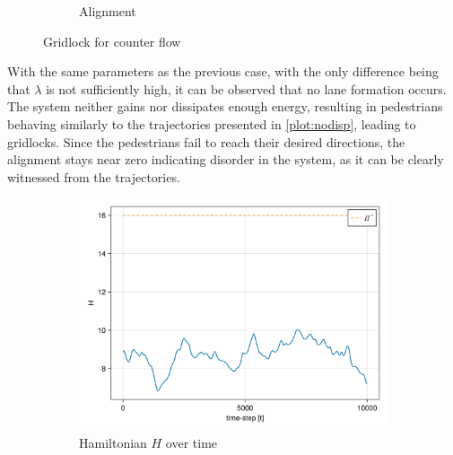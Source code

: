 \begin{itemize}
\begin{figure}[H]
\begin{subfigure}{.49\textwidth}
            \caption{Alignment}
            \label{plot:countergridlock_alignment}
        \end{subfigure}
        \caption{Gridlock for counter flow}
        \label{plot:countergridlock}
    \end{figure}
With the same parameters as the previous case, with the only difference being that $\lambda$ is not sufficiently high, it can be observed that no lane formation occurs. The system neither gains nor dissipates enough energy, resulting in pedestrians behaving similarly to the trajectories presented in \autoref{plot:nodisp}, leading to gridlocks. Since the pedestrians fail to reach their desired directions, the alignment stays near zero indicating disorder in the system, as it can be clearly witnessed from the trajectories.
    \begin{figure}[H]
        \centering
        \begin{subfigure}{.49\textwidth}
            \centering
            \includegraphics[width=\linewidth]{figures/ch5_collective/H_gridlock_counter.png}
            \caption{Hamiltonian $H$ over time}
            \label{plot:countergridlock_h}
        \end{subfigure}
        \begin{subfigure}{.49\textwidth}
            \centering

\end{subfigure}
\end{figure}
\end{itemize}
